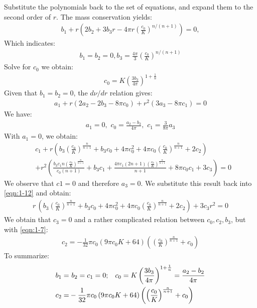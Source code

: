 \documentclass[10pt,oneside,headheight=10mm]{article}
\newcommand{\cb}[1]{\left(#1\right)}
\numberwithin{equation}{section}
\begin{document}
Substitute the polynomials back to the set of equations, and expand them to the second order of $r$. The mass conservation yields:
\begin{align}
    b_1+r \left(2 b_2 + 3b_3 r-4 \pi  r \left(\frac{c_0}{K}\right)^{n/(n+1)}\right)=0,
\end{align}
Which indicates:
\begin{align}\label{eqn:1-7}
    b_1 = b_2 = 0, b_3 = \frac{4\pi}{3}\cb{\frac{c_0}{K}}^{n/(n+1)}
\end{align}
Solve for $c_0$ we obtain:
\begin{align}
    c_0 = K\cb{\frac{3b_3}{4\pi}}^{1+\frac{1}{n}}
\end{align}
Given that $b_1 = b_2 = 0$, the $d\nu/dr$ relation gives:
\begin{align}
    a_1+r (2 a_2-2 b_3-8 \pi  c_0)+r^2 (3 a_3-8 \pi  c_1) = 0
\end{align}
We have:
\begin{align}
    a_1 = 0, \,\,c_0 = \frac{a_2 - b_2}{4\pi},\,\,c_1 = \frac{3}{8\pi}a_3
\end{align}
With $a_1 = 0$, we obtain:
\begin{align}\label{eqn:1-12}
  & c_1 + r \left(
    b_3 \left(\frac{c_0}{K}\right)^{\frac{n}{n+1}}
    + b_3 c_0
    + 4\pi c_0^2
    + 4\pi c_0 \left(\frac{c_0}{K}\right)^{\frac{n}{n+1}}
    + 2c_2
\right)\nonumber\\
 & + r^2 \left(
    \frac{b_3 c_1 n \left(\frac{c_0}{K}\right)^{\frac{n}{n+1}}}{c_0 (n+1)}
    + b_3 c_1
    + \frac{4\pi c_1 (2n+1) \left(\frac{c_0}{K}\right)^{\frac{n}{n+1}}}{n+1}
    + 8\pi c_0 c_1
    + 3c_3
\right)= 0
\end{align}
We observe that $c1 = 0$ and therefore $a_3 = 0$. We substitute this result back into \autoref{eqn:1-12} and obtain:
\begin{align}
    r\, \cb{ b_3 \left( \frac{c_0}{K} \right)^{\frac{n}{n+1}} + b_3 c_0 + 4\pi c_0^2 + 4\pi c_0 \left( \frac{c_0}{K} \right)^{\frac{n}{n+1}} + 2c_2 } + 3c_3 r^2 = 0
\end{align}
We obtain that $c_3 = 0$ and a rather complicated relation between $c_0, c_2, b_3$, but with \autoref{eqn:1-7}:
\begin{align}
    c_2 = -\frac{1}{32} \pi c_0 \left(9 \pi c_0 K + 64\right) \cb{ \left( \frac{c_0}{K} \right)^{\frac{n}{n+1}} + c_0 }
\end{align}
To summarize:
\begin{align}
    b_1 =&\,\, b_2 = c_1 = 0;\hspace{0.3cm} c_0 = K\cb{\frac{3b_3}{4\pi}}^{1+\frac{1}{n}}  =\frac{a_2 - b_2}{4\pi}\\
    c_2 =& -\frac{1}{32} \pi c_0 \left(9 \pi c_0 K + 64\right) \cb{ \left( \frac{c_0}{K} \right)^{\frac{n}{n+1}} + c_0 }
\end{align}
\end{document}

